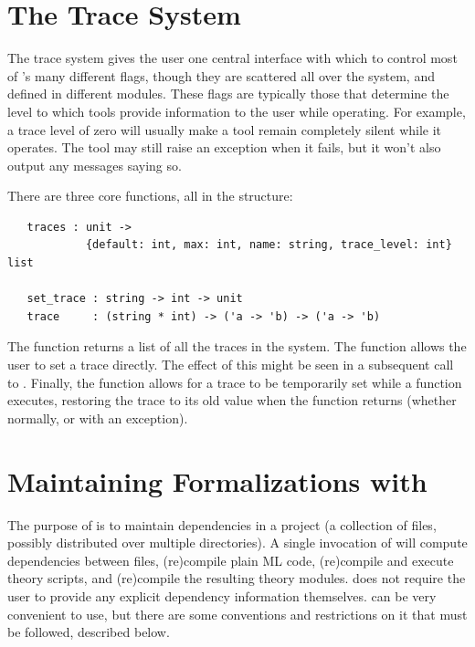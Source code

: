 \section{The Trace System}
\label{sec:traces}

The trace system gives the user one central interface with which to control most of \HOL's many different flags, though they are scattered all over the system, and defined in different modules.
These flags are typically those that determine the level to which \HOL{} tools provide information to the user while operating.
For example, a trace level of zero will usually make a tool remain completely
silent while it operates.
The tool may still raise an exception when it fails, but it won't also
output any messages saying so.

There are three core functions, all in the  structure:
\begin{hol}
\begin{verbatim}
   traces : unit ->
            {default: int, max: int, name: string, trace_level: int} list

   set_trace : string -> int -> unit
   trace     : (string * int) -> ('a -> 'b) -> ('a -> 'b)
\end{verbatim}
\end{hol}

The  function returns a list of all the traces in the system.
The  function allows the user to set a trace directly.
The effect of this might be seen in a subsequent call to .
Finally, the  function allows for a trace to be temporarily set while a function executes, restoring the trace to its old value when the function returns (whether normally, or with an exception).



\section{\texorpdfstring{Maintaining \HOL{} Formalizations with \holmake}{Maintaining HOL Formalizations with \holmake}}
\label{Holmake}

The purpose of \holmake{} is to maintain dependencies in a \HOL{} project (a collection of \HOL{} files, possibly distributed over multiple directories).
A single invocation of \holmake{} will compute dependencies between files, (re)compile plain ML code, (re)compile and execute theory scripts, and (re)compile the resulting theory modules.
\holmake{} does not require the user to provide any explicit dependency information themselves.
\holmake{} can be very convenient to use, but there are some conventions and restrictions on it that must be followed, described below.

